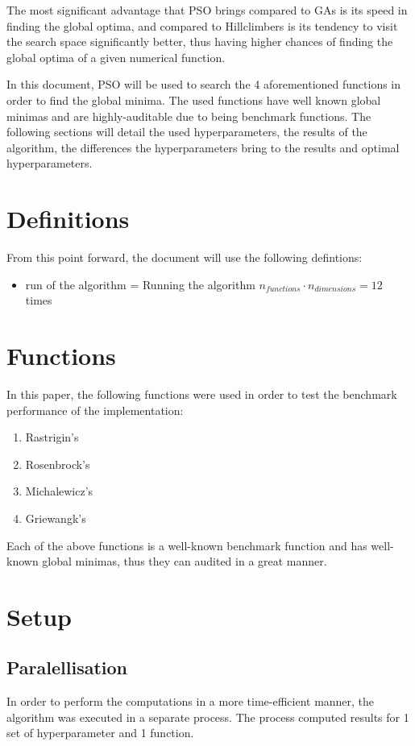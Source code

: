 \documentclass[conference]{IEEEtran}
\begin{document}
The most significant advantage that PSO brings compared to GAs is its speed in finding the global optima, and compared to Hillclimbers
is its tendency to visit the search space significantly better, thus having higher chances of finding the global optima of a
given numerical function.

In this document, PSO will be used to search the 4 aforementioned functions in order to find the global minima. The used functions
have well known global minimas and are highly-auditable due to being benchmark functions. The following sections will
detail the used hyperparameters, the results of the algorithm, the differences the hyperparameters bring to the results and
optimal hyperparameters.

\section{Definitions}
From this point forward, the document will use the following defintions:

\begin{itemize}
    \item run of the algorithm = Running the algorithm $n_{functions} \cdot n_{dimensions} = 12$ times
\end{itemize}

\section{Functions}
In this paper, the following functions were used in order to test the benchmark performance of the implementation:

\begin{enumerate}
    \item Rastrigin's
    \item Rosenbrock's
    \item Michalewicz's
    \item Griewangk's
\end{enumerate}

Each of the above functions is a well-known benchmark function and has well-known global minimas, thus they can audited
in a great manner.

\section{Setup}

\subsection{Paralellisation}
In order to perform the computations in a more time-efficient manner, the algorithm was executed in a separate process.
The process computed results for 1 set of hyperparameter and 1 function.
\end{document}
